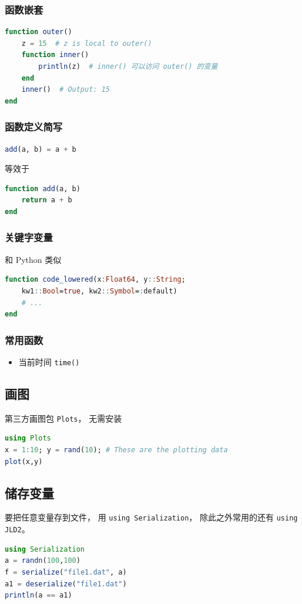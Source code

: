 \subsubsection{函数嵌套}
\begin{lstlisting}[language=julia]
function outer()
    z = 15  # z is local to outer()
    function inner()
        println(z)  # inner() 可以访问 outer() 的变量
    end
    inner()  # Output: 15
end
\end{lstlisting}

\subsubsection{函数定义简写}

\begin{lstlisting}[language=julia]
add(a, b) = a + b
\end{lstlisting}
等效于
\begin{lstlisting}[language=julia]
function add(a, b)
    return a + b
end
\end{lstlisting}

\subsubsection{关键字变量}
和 Python 类似
\begin{lstlisting}[language=julia]
function code_lowered(x:Float64, y::String;
    kw1::Bool=true, kw2::Symbol=:default)
    # ...
end
\end{lstlisting}

\subsubsection{常用函数}
\begin{itemize}
\item 当前时间 \verb`time()`
\end{itemize}



\subsection{画图}
第三方画图包 \verb`Plots`， 无需安装
\begin{lstlisting}[language=Julia]
using Plots
x = 1:10; y = rand(10); # These are the plotting data
plot(x,y)
\end{lstlisting}


\subsection{储存变量}
要把任意变量存到文件， 用 \verb`using Serialization`， 除此之外常用的还有 \verb`using JLD2`。
\begin{lstlisting}[language=julia]
using Serialization
a = randn(100,100)
f = serialize("file1.dat", a)
a1 = deserialize("file1.dat")
println(a == a1)
\end{lstlisting}

